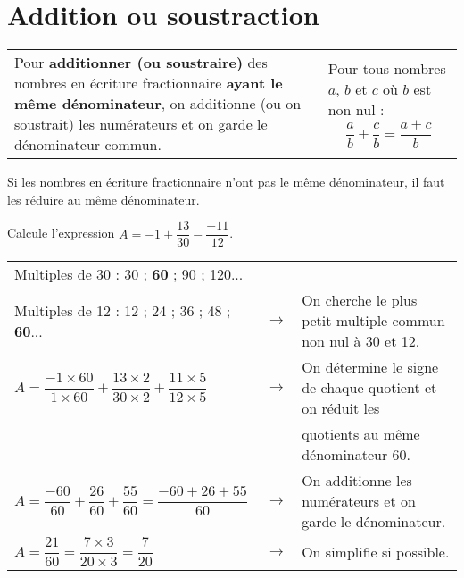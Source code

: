 \section{Addition ou soustraction}

\begin{aconnaitre}
\begin{tabular}{p{.6\linewidth}|p{.35\linewidth}}
Pour \textbf{additionner (ou soustraire)} des nombres en écriture fractionnaire \textbf{ayant le même dénominateur}, on additionne (ou on soustrait) les numérateurs et on garde le dénominateur commun. & Pour tous nombres $a$, $b$ et $c$ où $b$ est non nul : \[ \dfrac{a}{b}+\dfrac{c}{b}=\dfrac{a+c}{b} \] \\
\end{tabular}
\end{aconnaitre}



\begin{remarque}
Si les nombres en écriture fractionnaire n'ont pas le même dénominateur, il faut les réduire au même dénominateur.
\end{remarque}

\begin{exemple*1}

Calcule l'expression $A =-1+\dfrac{13}{30}-\dfrac{-11}{12}$.

\correction

\begin{tabular}{lcl}
Multiples de 30 : 30 ; \textbf{60} ; 90 ; 120... & & \\
Multiples de 12 : 12 ; 24 ; 36 ; 48 ; \textbf{60}... & $\longrightarrow$ & On cherche le plus petit multiple commun non nul à 30 et 12. \\
$A =\dfrac{-1 \times 60}{1 \times 60}+\dfrac{13 \times 2}{30 \times 2}+\dfrac{11 \times 5}{12 \times 5}$ & $\longrightarrow$ & On détermine le signe de chaque quotient et on réduit les \\
& & quotients au même dénominateur 60. \\
$A =\dfrac{-60}{60}+\dfrac{26}{60}+\dfrac{55}{60}=\dfrac{-60+26+55}{60}$ & $\longrightarrow$ & On additionne les numérateurs et on garde le dénominateur. \\
$A = \dfrac{21}{60}=\dfrac{7 \times 3}{20 \times 3}= \dfrac{7}{20}$ & $\longrightarrow$ & On simplifie si possible. \\
\end{tabular}

\end{exemple*1}



